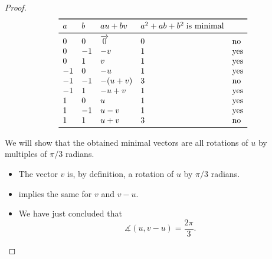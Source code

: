 \begin{proof}
  \begin{table}[!ht]
    \begin{equation*}
      \begin{array}{*{5}{l}}
        \toprule
        a  & b  & au + bv  & a^2 + ab + b^2 \T{is minimal} \\
        \midrule
        0  & 0  & \vect 0  & 0            & \T{no}  \\
        0  & -1 & -v       & 1            & \T{yes} \\
        0  & 1  & v        & 1            & \T{yes} \\
        -1 & 0  & -u       & 1            & \T{yes} \\
        -1 & -1 & -(u + v) & 3            & \T{no}  \\
        -1 & 1  & -u + v   & 1            & \T{yes} \\
        1  & 0  & u        & 1            & \T{yes} \\
        1  & -1 & u - v    & 1            & \T{yes} \\
        1  & 1  & u + v    & 3            & \T{no}  \\
        \bottomrule
      \end{array}
    \end{equation*}
    \caption{All linear combinations of \( u \) and \( v \) satisfying \eqref{eq:thm:hexagonal_point_lattice_minimal_vectors/proof/eq_square} in our proof of }\label{tab:thm:hexagonal_point_lattice_minimal_vectors/proof/eq_square}
  \end{table}

   We will show that the obtained minimal vectors are all rotations of \( u \) by multiples of \( \pi / 3 \) radians.

  \begin{itemize}
    \item The vector \( v \) is, by definition, a rotation of \( u \) by \( \pi / 3 \) radians.

    \item {} implies the same for \( v \) and \( v - u \).

    \item We have just concluded that
    \begin{equation*}
      \measuredangle(u, v - u) = \frac {2\pi} 3.
    \end{equation*}


\end{itemize}
\end{proof}
